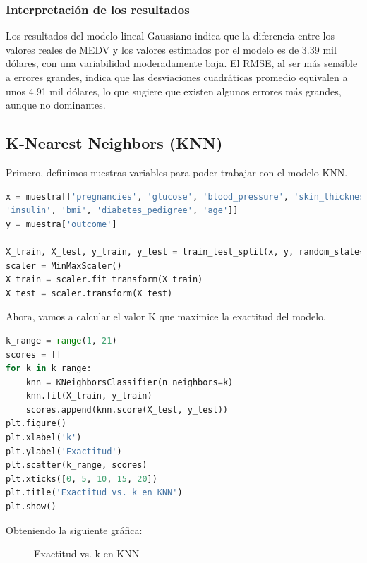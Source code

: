 \documentclass[12pt,a4paper]{article}
\begin{document}
\subsubsection{Interpretación de los resultados}

Los resultados del modelo lineal Gaussiano indica que la diferencia entre los valores reales de MEDV y los valores estimados por el modelo es de 3.39 mil dólares, con una variabilidad moderadamente baja.
El RMSE, al ser más sensible a errores grandes, indica que las desviaciones cuadráticas promedio equivalen a unos 4.91 mil dólares, lo que sugiere que existen algunos errores más grandes, aunque no dominantes.

\newpage

\subsection{K-Nearest Neighbors (KNN)}

Primero, definimos nuestras variables para poder trabajar con el modelo KNN.

\begin{lstlisting}[language=Python, frame=single, basicstyle=\ttfamily\small, breaklines=true]
x = muestra[['pregnancies', 'glucose', 'blood_pressure', 'skin_thickness',
'insulin', 'bmi', 'diabetes_pedigree', 'age']]
y = muestra['outcome']

X_train, X_test, y_train, y_test = train_test_split(x, y, random_state=4181, shuffle=True)
scaler = MinMaxScaler()
X_train = scaler.fit_transform(X_train)
X_test = scaler.transform(X_test)
\end{lstlisting}

Ahora, vamos a calcular el valor K que maximice la exactitud del modelo.

\begin{lstlisting}[language=Python, frame=single, basicstyle=\ttfamily\small, breaklines=true]
    k_range = range(1, 21)
scores = []
for k in k_range:
    knn = KNeighborsClassifier(n_neighbors=k)
    knn.fit(X_train, y_train)
    scores.append(knn.score(X_test, y_test))
plt.figure()
plt.xlabel('k')
plt.ylabel('Exactitud')
plt.scatter(k_range, scores)
plt.xticks([0, 5, 10, 15, 20])
plt.title('Exactitud vs. k en KNN')
plt.show()
\end{lstlisting}

Obteniendo la siguiente gráfica:

\begin{figure}[H]
\centering
\caption{Exactitud vs. k en KNN}
\label{fig:knn_accuracy}
\end{figure}
\end{document}

